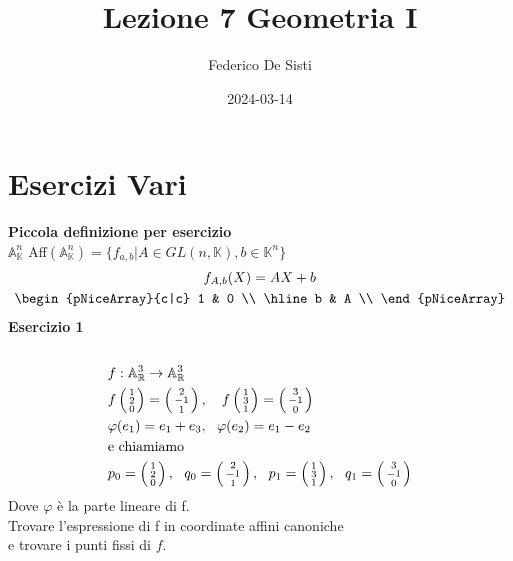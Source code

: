 \documentclass[12px]{article}
\title{Lezione 7 Geometria I}
\date{2024-03-14}
\author{Federico De Sisti}
\begin{document}
	\maketitle
	\newpage
	\section{Esercizi Vari}
	\textbf{Piccola definizione per esercizio}\\
	$ \mathbb{A}^n_ \mathbb{K}$   Aff$ (\mathbb{A} ^n_ \mathbb{K}) = \{f_{a,b}| A\in GL(n, \mathbb{K}), b\in \mathbb{K}^n\}$
\begin{gather*}
	f_{A,b}(X) = AX + b \\
	\begin{pNiceArray}{c|c}
		1 & 0 \\
		\hline
		b & A \\
	\end{pNiceArray} \\
\end{gather*}
\textbf{Esercizio 1}\\
\hline \ \\ 
\begin{align*}
	&f: \mathbb{A}^3_{\mathbb{R}} \rightarrow \mathbb{A}^3_{\mathbb{R}}\\
	&f\left(\begin{smallmatrix}1\\2\\0\end{smallmatrix}\right) = \left(\begin{smallmatrix}2\\-1\\1\end{smallmatrix}\right), \ \ \ f\left(\begin{smallmatrix}1\\3\\1\end{smallmatrix}\right) = \left(\begin{smallmatrix}3\\-1\\0\end{smallmatrix}\right) \\
	&\varphi(e_1) = e_1+e_3, \ \ \varphi(e_2) = e_1-e_2 \\
	& \text{e chiamiamo} \\
	&p_0 = \left(\begin{smallmatrix}1\\2\\0\end{smallmatrix}\right), \ \ q_0 = \left(\begin{smallmatrix}2\\-1\\1\end{smallmatrix}\right), \ \ p_1 = \left(\begin{smallmatrix}1\\3\\1\end{smallmatrix}\right), \ \ q_1 = \left(\begin{smallmatrix}3\\-1\\0\end{smallmatrix}\right)
\end{align*}
Dove $\varphi$ è la parte lineare di f.\\
Trovare l'espressione di f in coordinate affini canoniche \\e trovare i punti fissi  di $f$.\\
\end{document}

